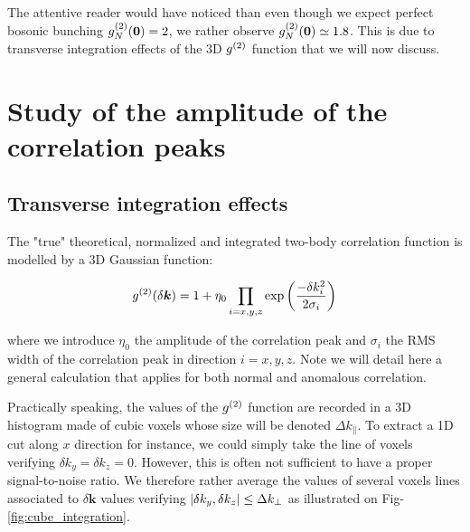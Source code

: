 The attentive reader would have noticed than even though we expect perfect bosonic bunching $g^{(2)}_N (\bm{0})=2$, we rather observe $g^{(2)}_N (\bm{0}) \simeq 1.8$. This is due to transverse integration effects of the 3D $g^{(2)}$ function that we will now discuss.

\section{Study of the amplitude of the correlation peaks}

\subsection{Transverse integration effects}

The "true" theoretical, normalized and integrated two-body correlation function is modelled by a 3D Gaussian function:

\begin{equation}
    g^{(2)} (\delta \bm{k}) = 1 + \eta_0 \prod_{i=x,y,z} \exp \left(\frac{-\delta k_i^2}{2 \sigma_i}\right)
    \label{eq:g2_theo}
\end{equation}

\noindent where we introduce $\eta_0$ the amplitude of the correlation peak and $\sigma_i$ the RMS width of the correlation peak in direction $i=x,y,z$. Note we will detail here a general calculation that applies for both normal and anomalous correlation.

Practically speaking, the values of the $g^{(2)}$ function are recorded in a 3D histogram made of cubic voxels whose size will be denoted $\Delta k_{\parallel}$. To extract a 1D cut along $x$ direction for instance, we could simply take the line of voxels verifying $\delta k_y=\delta k_z =0$. However, this is often not sufficient to have a proper signal-to-noise ratio. We therefore rather average the values of several voxels lines associated to $\delta \bm{k}$ values verifying $\left\lvert\delta k_y, \delta k_z\right\rvert \leq \Delta k_{\perp}$ as illustrated on Fig-\ref{fig:cube_integration}.

